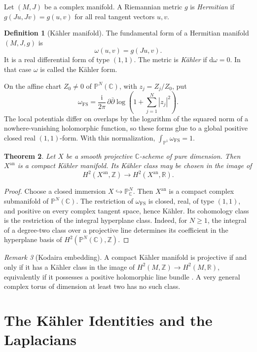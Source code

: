 \documentclass[11pt,reqno]{amsart}
\newtheorem{theorem}{Theorem}[section]
\theoremstyle{definition}
\newtheorem{definition}[theorem]{Definition}
\theoremstyle{remark}
\newtheorem{remark}[theorem]{Remark}
\newcommand{\C}{\mathbb{C}}
\newcommand{\R}{\mathbb{R}}
\newcommand{\Z}{\mathbb{Z}}
\newcommand{\PP}{\mathbb{P}}
\newcommand{\Xan}{X^{\mathrm{an}}}
\newcommand{\dd}{\mathrm{d}}
\newcommand{\ii}{\mathrm{i}}
\newcommand{\dbar}{\bar\partial}
\begin{document}
Let $(M,J)$ be a complex manifold. A Riemannian metric $g$ is \emph{Hermitian}
if $g(Ju,Jv)=g(u,v)$ for all real tangent vectors $u,v$.

\begin{definition}[K\"ahler manifold]
\label{def:kahler}
The fundamental form of a Hermitian manifold $(M,J,g)$ is
\[
\omega(u,v)=g(Ju,v).
\]
It is a real differential form of type $(1,1)$. The metric is \emph{K\"ahler}
if $\dd\omega=0$. In that case $\omega$ is called the K\"ahler form.
\end{definition}

On the affine chart $Z_0\neq0$ of $\PP^N(\C)$, with $z_j=Z_j/Z_0$, put
\[
\omega_{\mathrm{FS}}
=\frac{\ii}{2\pi}\,\partial\dbar
\log\left(1+\sum_{j=1}^N|z_j|^2\right).
\]
The local potentials differ on overlaps by the logarithm of the squared norm
of a nowhere-vanishing holomorphic function, so these forms glue to a global
positive closed real $(1,1)$-form. With this normalization,
$\int_{\PP^1}\omega_{\mathrm{FS}}=1$.

\begin{theorem}
\label{thm:proj-kahler}
Let $X$ be a smooth projective $\C$-scheme of pure dimension. Then $\Xan$ is a
compact K\"ahler manifold. Its K\"ahler class may be chosen in the image of
\[
H^2(\Xan,\Z)\longrightarrow H^2(\Xan,\R).
\]
\end{theorem}

\begin{proof}
Choose a closed immersion $X\hookrightarrow\PP^N_{\C}$. Then $\Xan$ is a compact
complex submanifold of $\PP^N(\C)$. The restriction of
$\omega_{\mathrm{FS}}$ is closed, real, of type $(1,1)$, and positive on every
complex tangent space, hence K\"ahler. Its cohomology class is the restriction of
the integral hyperplane class. Indeed, for $N\geq1$, the integral of a
degree-two class over a projective line determines its coefficient in
the hyperplane basis of $H^2(\PP^N(\C),\Z)$.
\end{proof}

\begin{remark}[Kodaira embedding]
\label{rem:kodaira}
A compact K\"ahler manifold is projective if and only if it has a K\"ahler
class in the image of $H^2(M,\Z)\to H^2(M,\R)$, equivalently if it possesses
a positive holomorphic line bundle \cite[\S5.3]{huybrechts2005complex}.
A very general complex torus of dimension at least two has no such class.
\end{remark}

\section{The K\"ahler Identities and the Laplacians}
\label{sec:kahler-identities}
\end{document}
